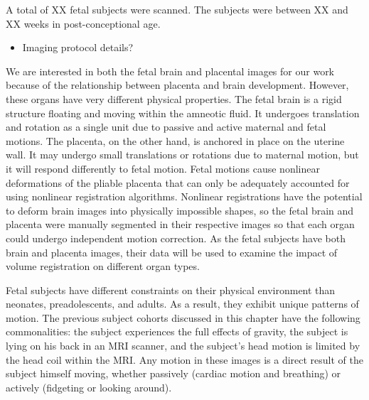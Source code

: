 A total of XX fetal subjects were scanned. The subjects were between XX and XX weeks in post-conceptional age. 

\begin{itemize}
\item Imaging protocol details?
\end{itemize} 


We are interested in both the fetal brain and placental images for our work because of the relationship between placenta and brain development. However, these organs have very different physical properties. The fetal brain is a rigid structure floating and moving within the amneotic fluid. It undergoes translation and rotation as a single unit due to passive and active maternal and fetal motions. The placenta, on the other hand, is anchored in place on the uterine wall. It may undergo small translations or rotations due to maternal motion, but it will respond differently to fetal motion. Fetal motions cause nonlinear deformations of the pliable placenta that can only be adequately accounted for using nonlinear registration algorithms. Nonlinear registrations have the potential to deform brain images into physically impossible shapes, so the fetal brain and placenta were manually segmented in their respective images so that each organ could undergo independent motion correction. As the fetal subjects have both brain and placenta images, their data will be used to examine the impact of volume registration on different organ types.

Fetal subjects have different constraints on their physical environment than neonates, preadolescents, and adults. As a result, they exhibit unique patterns of motion. The previous subject cohorts discussed in this chapter have the following commonalities: the subject experiences the full effects of gravity, the subject is lying on his back in an MRI scanner, and the subject's head motion is limited by the head coil within the MRI. Any motion in these images is a direct result of the subject himself moving, whether passively (cardiac motion and breathing) or actively (fidgeting or looking around).

